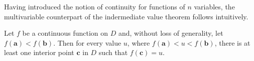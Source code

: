 %


%






\ifanalysis

Having introduced the notion of continuity for functions of $n$ variables, the multivariable counterpart of the indermediate value theorem follows intuitively. 

\begin{theorem}\label{thm:IVTmulti}
Let $f$ be a continuous function on $D$ and, without loss of generality, let $f(\mathbf{a}) < f(\mathbf{b})$. Then for every value $u$, where $f(\mathbf{a}) < u < f(\mathbf{b})$, there is at least one interior point $\mathbf{c}$ in $D$ such that $f(\mathbf{c}) = u$. 
\end{theorem}



